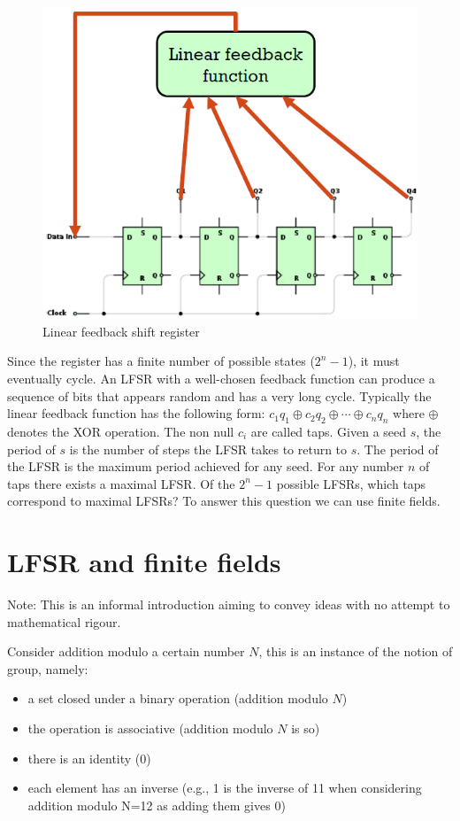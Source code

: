 \begin{figure}
	\centering
	\includegraphics[width=0.7\linewidth]{Images/Chapter2/lfsr}
	\caption{Linear feedback shift register}
	\label{fig:lfsr}
\end{figure}

Since the register has a finite number of possible states ($2^n - 1$), it must eventually cycle. An LFSR with a well-chosen feedback
function can produce a sequence of bits that appears random and has a very long cycle. Typically the linear feedback function has the following form: $c_1 q_1 \oplus c_2 q_2 \oplus \cdots \oplus c_n q_n$ where $\oplus$ denotes the XOR operation. The non null $c_i$ are called taps.
Given a seed $s$, the period of $s$ is the number of steps the LFSR takes to return to $s$. The period of the LFSR is the maximum period achieved for any seed. For any number $n$ of taps there exists a maximal LFSR. Of the $2^{n}-1$ possible LFSRs, which taps correspond to maximal LFSRs? To answer this question we can use finite fields.

\section{LFSR and finite fields} 

Note: This is an informal introduction aiming to convey ideas with no attempt to mathematical rigour.

Consider addition modulo a certain number $N$, this is an instance of the notion of group, namely:
\begin{itemize}
	\item a set closed under a binary operation (addition modulo $N$)
	\item the operation is associative (addition modulo $N$ is so)
	\item there is an identity (0)
	\item each element has an inverse (e.g., 1 is the inverse of 11 when considering addition modulo N=12 as adding them gives 0)
\end{itemize}

